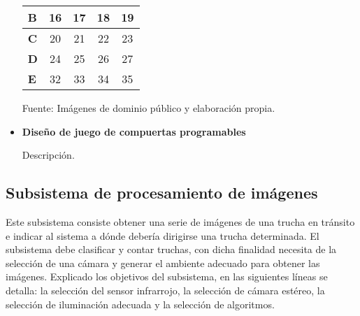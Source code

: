 \begin{itemize}
\begin{mytable}[H]
\begin{tabular}{l|c|c|c|c|}
			\multicolumn{1}{|l|}{\textbf{B}}          & 16                                                                    & 17         & 18         & 19         \\ \hline
			\multicolumn{1}{|l|}{\textbf{C}}          & 20                                                                    & 21         & 22         & 23         \\ \hline
			\multicolumn{1}{|l|}{\textbf{D}}          & 24                                                                    & 25         & 26         & 27         \\ \hline
			\multicolumn{1}{|l|}{\textbf{E}}          & 32                                                                    & 33         & 34         & 35         \\ \hline
		\end{tabular}
		\begin{flushleft}	
			Fuente: Imágenes de dominio público y elaboración propia.
		\end{flushleft}
	\end{mytable}
	
	
%		
%		
%		
%		


	
	
	
	\item \textbf{Diseño de juego de compuertas programables}
	
	Descripción.

\end{itemize}





\subsection{Subsistema de procesamiento de imágenes}
\label{ssec:subsistema de procesamiento de imágenes}

Este subsistema consiste obtener una serie de imágenes de una trucha en tránsito e indicar al sistema a dónde debería dirigirse una trucha determinada. El subsistema debe clasificar y contar truchas, con dicha finalidad necesita de la selección de una cámara y generar el ambiente adecuado para obtener las imágenes. Explicado los objetivos del subsistema, en las siguientes líneas se detalla: la selección del sensor infrarrojo, la selección de cámara estéreo, la selección de iluminación adecuada y la selección de algoritmos.

